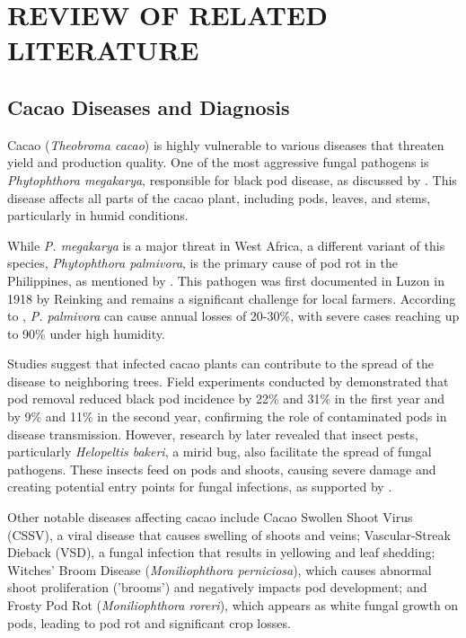\chapter{REVIEW OF RELATED LITERATURE}
\section{Cacao Diseases and Diagnosis}
Cacao (\textit{Theobroma cacao}) is highly vulnerable to various diseases that threaten yield and production quality. One of the most aggressive fungal pathogens is \textit{Phytophthora megakarya}, responsible for black pod disease, as discussed by \cite{Andrews1997}. This disease affects all parts of the cacao plant, including pods, leaves, and stems, particularly in humid conditions.

While \textit{P. megakarya} is a major threat in West Africa, a different variant of this species, \textit{Phytophthora palmivora}, is the primary cause of pod rot in the Philippines, as mentioned by \cite{Solpot2020}. This pathogen was first documented in Luzon in 1918 by Reinking and remains a significant challenge for local farmers. According to \cite{AceboGuerrero2012}, \textit{P. palmivora} can cause annual losses of 20-30\%, with severe cases reaching up to 90\% under high humidity.

Studies suggest that infected cacao plants can contribute to the spread of the disease to neighboring trees. Field experiments conducted by \cite{Ndoumbe2004} demonstrated that pod removal reduced black pod incidence by 22\% and 31\% in the first year and by 9\% and 11\% in the second year, confirming the role of contaminated pods in disease transmission. However, research by \cite{Babin2018} later revealed that insect pests, particularly \textit{Helopeltis bakeri}, a mirid bug, also facilitate the spread of fungal pathogens. These insects feed on pods and shoots, causing severe damage and creating potential entry points for fungal infections, as supported by \cite{Guest2007}.

Other notable diseases affecting cacao include Cacao Swollen Shoot Virus (CSSV), a viral disease that causes swelling of shoots and veins; Vascular-Streak Dieback (VSD), a fungal infection that results in yellowing and leaf shedding; Witches' Broom Disease (\textit{Moniliophthora perniciosa}), which causes abnormal shoot proliferation ('brooms') and negatively impacts pod development; and Frosty Pod Rot (\textit{Moniliophthora roreri}), which appears as white fungal growth on pods, leading to pod rot and significant crop losses.


